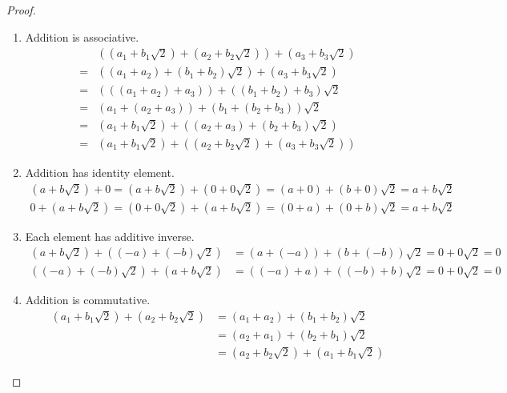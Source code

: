 \begin{proof}
	\begin{enumerate}[label = (\arabic*)]
		\item Addition is associative.
		      \begin{align*}
			        & \left((a_{1} + b_{1}\sqrt{2}) + (a_{2} + b_{2}\sqrt{2})\right) + (a_{3} + b_{3}\sqrt{2})                    \\
			      = & \left((a_{1} + a_{2}) + (b_{1} + b_{2})\sqrt{2}\right) + (a_{3} + b_{3}\sqrt{2})                            \\
			      = & \left(\left((a_{1} + a_{2}) + a_{3}\right)\right) + \left(\left(b_{1} + b_{2}\right) + b_{3}\right)\sqrt{2} \\
			      = & \left(a_{1} + \left(a_{2} + a_{3}\right)\right) + \left(b_{1} + \left(b_{2} + b_{3}\right)\right)\sqrt{2}   \\
			      = & (a_{1} + b_{1}\sqrt{2}) + \left((a_{2} + a_{3}) + (b_{2} + b_{3})\sqrt{2}\right)                            \\
			      = & (a_{1} + b_{1}\sqrt{2}) + \left((a_{2} + b_{2}\sqrt{2}) + (a_{3} + b_{3}\sqrt{2})\right)
		      \end{align*}
		\item Addition has identity element.
		      \begin{align*}
			      (a + b\sqrt{2}) + 0 = (a + b\sqrt{2}) + (0 + 0\sqrt{2}) = (a + 0) + (b + 0)\sqrt{2} = a + b\sqrt{2} \\
			      0 + (a + b\sqrt{2}) = (0 + 0\sqrt{2}) + (a + b\sqrt{2}) = (0 + a) + (0 + b)\sqrt{2} = a + b\sqrt{2}
		      \end{align*}
		\item Each element has additive inverse.
		      \begin{align*}
			      (a + b\sqrt{2}) + ((-a) + (-b)\sqrt{2}) & = (a + (-a)) + (b + (-b))\sqrt{2} = 0 + 0\sqrt{2} = 0 \\
			      ((-a) + (-b)\sqrt{2}) + (a + b\sqrt{2}) & = ((-a) + a) + ((-b) + b)\sqrt{2} = 0 + 0\sqrt{2} = 0
		      \end{align*}
		\item Addition is commutative.
		      \begin{align*}
			      (a_{1} + b_{1}\sqrt{2}) + (a_{2} + b_{2}\sqrt{2}) & = (a_{1} + a_{2}) + (b_{1} + b_{2})\sqrt{2}         \\
			                                                        & = (a_{2} + a_{1}) + (b_{2} + b_{1})\sqrt{2}         \\
			                                                        & = (a_{2} + b_{2}\sqrt{2}) + (a_{1} + b_{1}\sqrt{2})

\end{align*}
\end{enumerate}
\end{proof}
